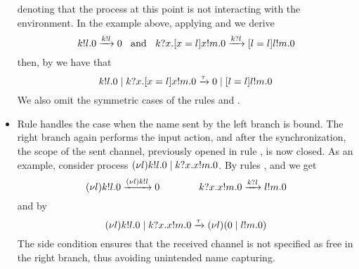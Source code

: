 \begin{itemize}
denoting that the process at this point is not interacting with the environment.
In the example above, applying  and  we derive 
\[
k!l.0
\xrightarrow{k!l}
0 
\;\;\text{ and }\;\;
k?x.[ x = l ]x!m.0
\xrightarrow{k?l}
[ l = l ]l!m.0
\]
then, by  we have that
\[
k!l.0 \;|\; k?x.[ x = l ]x!m.0
\xrightarrow{\tau} 
0 \;|\; [ l = l ]l!m.0
\]
We also omit the symmetric cases of the rules  and .
%
%
\item Rule  handles the case when the name sent by the left branch is bound. 
The right branch again performs the input action, and after 
the synchronization, the scope of the sent channel, previously opened in rule , is now closed.
As an example, consider process $(\nu l)k!l.0 \;|\; k?x.x!m.0$. 
By rules ,  and  we get
\[
(\nu l)k!l.0
\xrightarrow{(\nu l)k!l} 0
\qquad\qquad
k?x.x!m.0
\xrightarrow{k?l}
l!m.0
\]
and by 
\[
(\nu l)k!l.0 \;|\; k?x.x!m.0
\xrightarrow{\tau} 
(\nu l)(0 \;|\; l!m.0)
\]
The side condition ensures that the received channel is not specified as free in the right branch, thus avoiding unintended name capturing. 

\end{itemize}
